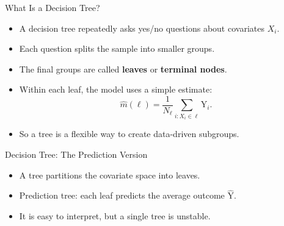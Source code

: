 \documentclass[hyperref={pdfpagelabels=false}]{beamer}
\begin{document}
\begin{frame}{What Is a Decision Tree?}
\begin{itemize}
  \item A decision tree repeatedly asks yes/no questions about covariates $X_i$.
  \vspace{0.2cm}
  \item Each question splits the sample into smaller groups.
  \vspace{0.2cm}
  \item The final groups are called \textbf{leaves} or \textbf{terminal nodes}.
  \vspace{0.2cm}
  \item Within each leaf, the model uses a simple estimate:
  \[
    \hat{m}(\ell)=\frac{1}{N_\ell}\sum_{i:X_i\in \ell}\mathrm{Y}_i.
  \]
  \vspace{0.2cm}
  \item So a tree is a flexible way to create data-driven subgroups.
\end{itemize}
\end{frame}

\begin{frame}{Decision Tree: The Prediction Version}
\begin{center}
\end{center}

\vspace{0.25cm}
\begin{itemize}
  \item A tree partitions the covariate space into leaves.
  \item Prediction tree: each leaf predicts the average outcome $\hat{\mathrm{Y}}$.
  \item It is easy to interpret, but a single tree is unstable.
\end{itemize}
\end{frame}
\end{document}

